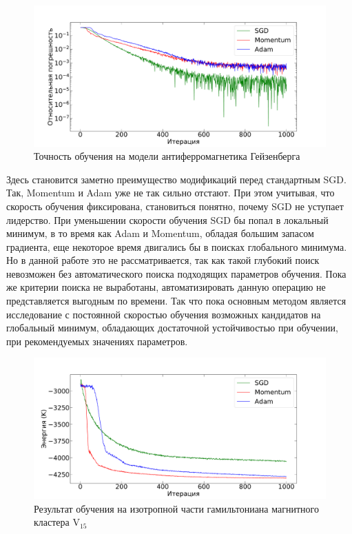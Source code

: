\begin{figure}[b!]
    \centering
    \includegraphics[width=\linewidth]{pictures/error_heisenberg_model}
    \caption[]{Точность обучения на модели антиферромагнетика Гейзенберга}
    \label{fig:errorheisenbergmodel}
\end{figure}

Здесь становится заметно преимущество модификаций перед стандартным SGD.
Так, Momentum и Adam уже не так сильно отстают.
При этом учитывая, что скорость обучения фиксирована, становиться понятно, почему SGD не уступает лидерство.
При уменьшении скорости обучения SGD бы попал в локальный минимум, в то время как Adam и Momentum, обладая большим запасом градиента, еще некоторое время двигались бы в поисках глобального минимума. 
Но в данной работе это не рассматривается, так как такой глубокий поиск невозможен без автоматического поиска подходящих параметров обучения.
Пока же критерии поиска не выработаны, автоматизировать данную операцию не представляется выгодным по времени.
Так что пока основным методом является исследование с постоянной скоростью обучения возможных кандидатов на глобальный минимум, обладающих достаточной устойчивостью при обучении, при рекомендуемых значениях параметров.

\begin{figure}
    \centering
    \includegraphics[width=\linewidth]{pictures/energy_v15_isotropic}
    \caption[]{Результат обучения на изотропной части гамильтониана магнитного кластера $\text{V}_{15}$}
    \label{fig:energyv15isotropic}
\end{figure}


